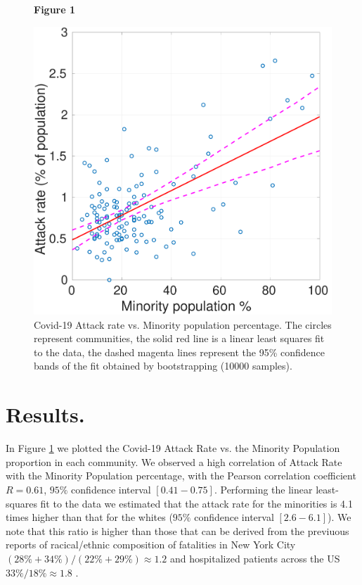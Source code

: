 \documentclass[twoside,12pt,onecolumn]{article}
\begin{document}
\begin{figure}[b!]
  \begin{center}
  \textbf{Figure 1}

  \includegraphics[width=0.6\linewidth]{AttackRateVsMinorityPopulation.pdf}
  \end{center}

  \caption{Covid-19 Attack rate vs. Minority population percentage. The circles represent communities, the solid red line is a linear least squares fit to the data, the dashed magenta lines represent the 95\% confidence bands of the fit obtained by bootstrapping (10000 samples).}

  \label{fig:AttackRateVsMinority}
\end{figure}

\section{Results.}

In Figure \ref{fig:AttackRateVsMinority} we plotted the Covid-19 Attack Rate vs. the Minority Population proportion in each community.
We observed a high correlation of Attack Rate with the Minority Population percentage, with the Pearson correlation coefficient
$R=0.61$,
$95\%$ confidence interval $[0.41-0.75]$.
Performing the linear least-squares fit to the data we estimated that the attack rate for the minorities is 4.1 times higher than that for the whites ($95\%$ confidence interval $[2.6-6.1]$).
We note that this ratio is higher than those that can be derived from the previuous reports of racical/ethnic composition of fatalities in New York City
$(28\%+34\%)/(22\%+29\%) \approx 1.2$
\cite{NYS_COVID19_tracker} and hospitalized patients across the US $ 33\%/18\% \approx 1.8 $ \cite{COVID-NET_2020}.
\end{document}
